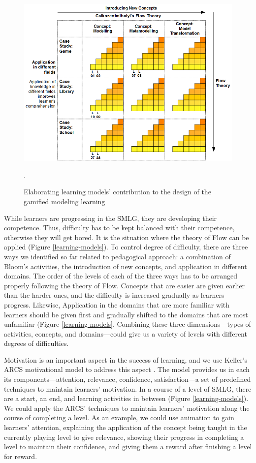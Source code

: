 \documentclass[12pt, a4paper]{report}
\begin{document}
\begin{figure}[ht]
\centering
\includegraphics[width=\textwidth]{learning-models2}
\caption{Elaborating learning models' contribution to the design of the gamified modeling learning}.
\label{learning-models2}
\end{figure}

While learners are progressing in the SMLG, they are developing their competence. Thus, difficulty has to be kept balanced with their competence, otherwise they will get bored. It is the situation where the theory of Flow can be applied (Figure \ref{learning-models}). To control degree of difficulty, there are three ways we identified so far related to pedagogical approach: a combination of Bloom's activities, the introduction of new concepts, and application in different domains. The order of the levels of each of the three ways has to be arranged properly following the theory of Flow. Concepts that are easier are given earlier than the harder ones, and the difficulty is increased gradually as learners progress. Likewise, Application in the domains that are more familiar with learners should be given first and gradually shifted to the domains that are most unfamiliar (Figure \ref{learning-models}. Combining these three dimensions---types of activities, concepts, and domains---could give us a variety of levels with different degrees of difficulties.

Motivation is an important aspect in the success of learning, and we use Keller's ARCS motivational model to address this aspect \cite{keller2010motivational}. The model provides us in each its components---attention, relevance, confidence, satisfaction---a set of predefined techniques to maintain learners' motivation. In a course of a level of SMLG, there are a start, an end, and learning activities in between (Figure \ref{learning-models}). We could apply the ARCS' techniques to maintain learners' motivation along the course of completing a level. As an example, we could use animation to gain learners' attention, explaining the application of the concept being taught in the currently playing level to give relevance, showing their progress in completing a level to maintain their confidence, and giving them a reward after finishing a level for reward.
 
\end{document}
